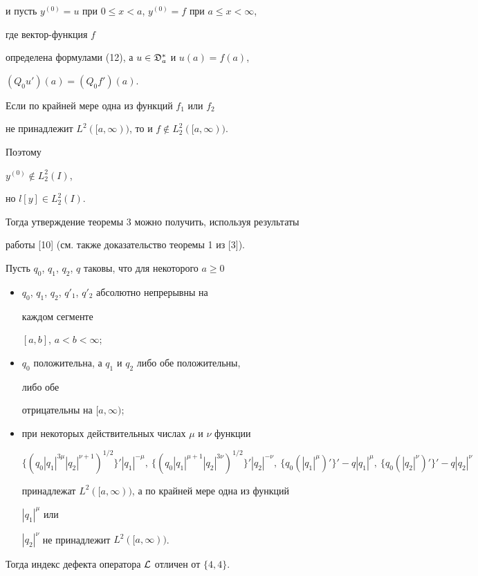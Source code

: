 и пусть $y^{(0)}=u$ при $0\le x<a$, $y^{(0)}=f$ при $a\le x<\infty$, 


где вектор-функция $f$ 


определена формулами (12), а $u\in\frak D^*_a$ и $u(a)=f(a)$, 


$(Q_0u')(a)=(Q_0f')(a)$. 


Если по крайней мере одна из функций $f_1$ или $f_2$ 


не принадлежит $L^2([a,\infty))$, то и $f\notin L^2_2([a,\infty))$. 


Поэтому 


$y^{(0)}\notin L^2_2(I)$, 


но $l[y]\in L^2_2(I)$. 


Тогда утверждение теоремы 3 можно получить, используя результаты 


работы [10] (см. также доказательство теоремы 1 из [3]). 


 


\begin{cor} 


Пусть $q_0$, $q_1$, $q_2$, $q$ таковы, что для некоторого $a\ge0$ 


\begin{itemize} 


\item[1)] $q_0$, $q_1$, $q_2$, $q'_1$, $q'_2$ абсолютно непрерывны на 


каждом сегменте 


$[a,b]$, $a<b<\infty$; 


\item[2)] $q_0$ положительна, а $q_1$ и $q_2$ либо обе положительны, 


либо обе 


отрицательны на $[a,\infty)$; 


\item[3)] при некоторых действительных числах $\mu$ и $\nu$ функции 


$$ 


\{(q_0|q_1|^{3\mu}|q_2|^{\nu+1})^{1/2}\}'|q_1|^{-\mu}, 


\ \{(q_0|q_1|^{\mu+1}|q_2|^{3\nu})^{1/2}\}'|q_2|^{-\nu}, 


\ \{q_0(|q_1|^\mu)'\}'-q|q_1|^\mu, 


\ \{q_0(|q_2|^\nu)'\}'-q|q_2|^\nu 


$$ 


принадлежат $L^2([a,\infty))$, а по крайней мере одна из функций 


$|q_1|^\mu$ или 


$|q_2|^\nu$ не принадлежит $L^2([a,\infty))$. 


\end{itemize} 


Тогда индекс дефекта оператора $\cal L$ отличен от $\{4,4\}$. 


\end{cor} 



